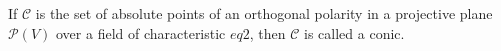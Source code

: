 If $\mathcal{C}$ is the set of absolute points of an orthogonal polarity in a projective plane $\mathcal{P}(V)$ over a field of characteristic $
eq 2$, then $\mathcal{C}$ is called a conic.
